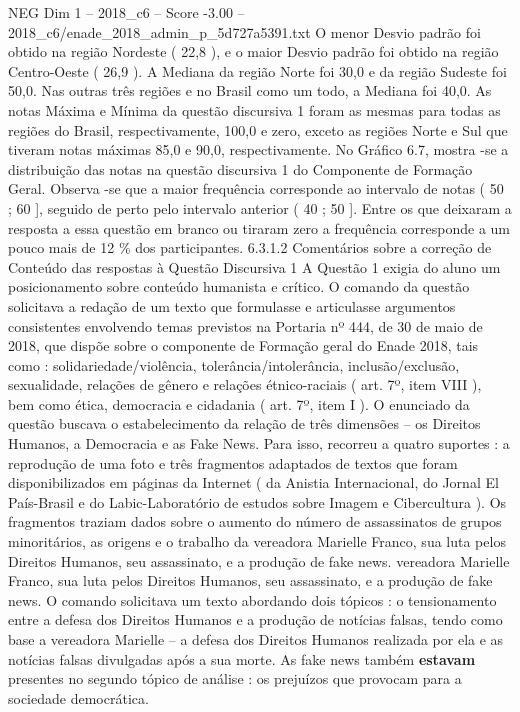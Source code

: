 \begin{textsample}{NEG Dim 1 – 2018\_c6 – Score -3.00 – 2018\_c6/enade\_2018\_admin\_p\_5d727a5391.txt}
O menor Desvio padrão foi obtido na região Nordeste ( 22,8 ), e o maior Desvio padrão foi obtido na região Centro-Oeste ( 26,9 ).
A Mediana da região Norte foi 30,0 e da região Sudeste foi 50,0.
Nas outras três regiões e no Brasil como um todo, a Mediana foi 40,0.
As notas Máxima e Mínima da questão discursiva 1 foram as mesmas para todas as regiões do Brasil, respectivamente, 100,0 e zero, exceto as regiões Norte e Sul que tiveram notas máximas 85,0 e 90,0, respectivamente.
No Gráfico 6.7, mostra -se a distribuição das notas na questão discursiva 1 do Componente de Formação Geral.
Observa -se que a maior frequência corresponde ao intervalo de notas ( 50 ; 60 ], seguido de perto pelo intervalo anterior ( 40 ; 50 ].
Entre os que deixaram a resposta a essa questão em branco ou tiraram zero a frequência corresponde a um pouco mais de 12 \% dos participantes. 6.3.1.2 Comentários sobre a correção de Conteúdo das respostas à Questão Discursiva 1 A Questão 1 exigia do aluno um posicionamento sobre conteúdo humanista e crítico.
O comando da questão solicitava a redação de um texto que formulasse e articulasse argumentos consistentes envolvendo temas previstos na Portaria nº 444, de 30 de maio de 2018, que dispõe sobre o componente de Formação geral do Enade 2018, tais como : solidariedade/violência, tolerância/intolerância, inclusão/exclusão, sexualidade, relações de gênero e relações étnico-raciais ( art. 7º, item VIII ), bem como ética, democracia e cidadania ( art. 7º, item I ).
O enunciado da questão buscava o estabelecimento da relação de três dimensões – os Direitos Humanos, a Democracia e as Fake News.
Para isso, recorreu a quatro suportes : a reprodução de uma foto e três fragmentos adaptados de textos que foram disponibilizados em páginas da Internet ( da Anistia Internacional, do Jornal El País-Brasil e do Labic-Laboratório de estudos sobre Imagem e Cibercultura ).
Os fragmentos traziam dados sobre o aumento do número de assassinatos de grupos minoritários, as origens e o trabalho da vereadora Marielle Franco, sua luta pelos Direitos Humanos, seu assassinato, e a produção de fake news. vereadora Marielle Franco, sua luta pelos Direitos Humanos, seu assassinato, e a produção de fake news.
O comando solicitava um texto abordando dois tópicos : o tensionamento entre a defesa dos Direitos Humanos e a produção de notícias falsas, tendo como base a vereadora Marielle – a defesa dos Direitos Humanos realizada por ela e as notícias falsas divulgadas após a sua morte.
As fake news também \textbf{estavam} presentes no segundo tópico de análise : os prejuízos que provocam para a sociedade democrática.

\end{textsample}
